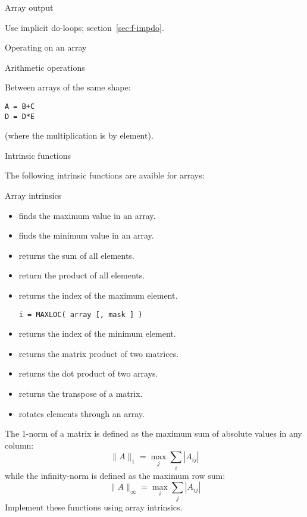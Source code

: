  {Array output}

Use implicit do-loops; section~\ref{sec:f-impdo}.

 {Operating on an array}

 {Arithmetic operations}

Between arrays of the same shape:
\begin{verbatim}
A = B+C
D = D*E
\end{verbatim}
(where the multiplication is by element).

 {Intrinsic functions}

The following intrinsic functions are avaible for arrays:
\begin{block}{Array intrinsics}
  \label{sl:array-funcf}
  \begin{itemize}
  \item {} finds the maximum value in an array.
  \item {} finds the minimum value in an array.
  \item {} returns the sum of all elements.
  \item {} return the product of all elements.
  \item {} returns the index of the maximum
    element.
\begin{verbatim}
i = MAXLOC( array [, mask ] )
\end{verbatim}
  \item {} returns the index of the minimum element.
  \item {} returns the matrix product of two matrices.
  \item {} returns the dot product of two
    arrays.
  \item {} returns the transpose of a matrix.
  \item {} rotates elements through an array.
  \end{itemize}
\end{block}

\begin{exercise}
  \label{ex:fmatnorm}
  The 1-norm of a matrix is defined as the maximum sum of absolute
  values in any column:
  \[ \|A\|_1 = \max_j \sum_i |A_{ij}| \]
  while the infinity-norm is defined as the maximum row sum:
  \[ \|A\|_\infty = \max_i \sum_j |A_{ij}| \]
  Implement these functions using array intrinsics.
\end{exercise}

